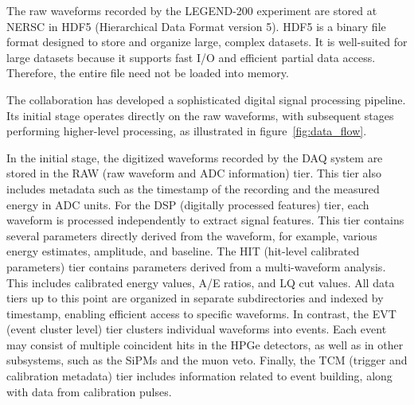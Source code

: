The raw waveforms recorded by the LEGEND-200 experiment are stored at NERSC in HDF5 (Hierarchical Data Format version 5). HDF5 is a binary file format designed to store and organize large, complex datasets. It is well-suited for large datasets because it supports fast I/O and efficient partial data access. Therefore, the entire file need not be loaded into memory. 

The collaboration has developed a sophisticated digital signal processing pipeline. Its initial stage operates directly on the raw waveforms, with subsequent stages performing higher-level processing, as illustrated in figure~\ref{fig:data_flow}. 

In the initial stage, the digitized waveforms recorded by the DAQ system are stored in the RAW (raw waveform and ADC information) tier. This tier also includes metadata such as the timestamp of the recording and the measured energy in ADC units. 
For the DSP (digitally processed features)  tier, each waveform is processed independently to extract signal features. This tier contains several parameters directly derived from the waveform, for example, various energy estimates, amplitude, and baseline. 
The HIT (hit-level calibrated parameters) tier contains parameters derived from a multi-waveform analysis. This includes calibrated energy values, A/E ratios, and LQ cut values. All data tiers up to this point are organized in separate subdirectories and indexed by timestamp, enabling efficient access to specific waveforms. 
In contrast, the EVT (event cluster level) tier clusters individual waveforms into events. Each event may consist of multiple coincident hits in the HPGe detectors, as well as in other subsystems, such as the SiPMs and the muon veto. 
Finally, the TCM (trigger and calibration metadata) tier includes information related to event building, along with data from calibration pulses.


